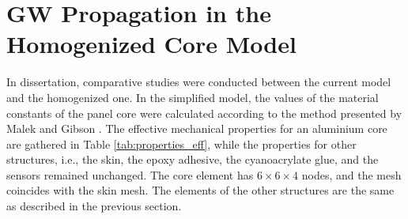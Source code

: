 \section{GW Propagation in the Homogenized Core Model}
\label{sec:homogenized}

In dissertation, comparative studies were conducted between the current model and the homogenized one. 
In the simplified model, the values of the material constants of the panel core were calculated according to the method presented by Malek and Gibson \cite{malek2015effective}.
The effective mechanical properties for an aluminium core are gathered in Table \ref{tab:properties_eff}, while the properties for other structures, i.e., the skin, the epoxy adhesive, the cyanoacrylate glue, and the sensors remained unchanged.
The core element has \(6 \times 6 \times 4\) nodes, and the mesh coincides with the skin mesh.
The elements of the other structures are the same as described in the previous section.
